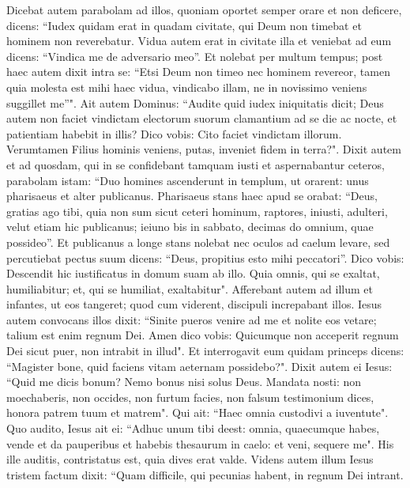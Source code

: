 \begin{biblechapter}  
\verse Dicebat autem parabolam ad illos, quoniam oportet semper orare et non deficere, 
\verse dicens: “Iudex quidam erat in quadam civitate, qui Deum non timebat et hominem non reverebatur. 
\verse Vidua autem erat in civitate illa et veniebat ad eum dicens: “Vindica me de adversario meo”. 
\verse Et nolebat per multum tempus; post haec autem dixit intra se: “Etsi Deum non timeo nec hominem revereor, 
\verse tamen quia molesta est mihi haec vidua, vindicabo illam, ne in novissimo veniens suggillet me”". 
\verse Ait autem Dominus: “Audite quid iudex iniquitatis dicit; 
\verse Deus autem non faciet vindictam electorum suorum clamantium ad se die ac nocte, et patientiam habebit in illis? 
\verse Dico vobis: Cito faciet vindictam illorum. Verumtamen Filius hominis veniens, putas, inveniet fidem in terra?". 
\verse Dixit autem et ad quosdam, qui in se confidebant tamquam iusti et aspernabantur ceteros, parabolam istam: 
\verse “Duo homines ascenderunt in templum, ut orarent: unus pharisaeus et alter publicanus. 
\verse Pharisaeus stans haec apud se orabat: “Deus, gratias ago tibi, quia non sum sicut ceteri hominum, raptores, iniusti, adulteri, velut etiam hic publicanus; 
\verse ieiuno bis in sabbato, decimas do omnium, quae possideo”. 
\verse Et publicanus a longe stans nolebat nec oculos ad caelum levare, sed percutiebat pectus suum dicens: “Deus, propitius esto mihi peccatori”. 
\verse Dico vobis: Descendit hic iustificatus in domum suam ab illo. Quia omnis, qui se exaltat, humiliabitur; et, qui se humiliat, exaltabitur". 
\verse Afferebant autem ad illum et infantes, ut eos tangeret; quod cum viderent, discipuli increpabant illos. 
\verse Iesus autem convocans illos dixit: “Sinite pueros venire ad me et nolite eos vetare; talium est enim regnum Dei. 
\verse Amen dico vobis: Quicumque non acceperit regnum Dei sicut puer, non intrabit in illud". 
\verse Et interrogavit eum quidam princeps dicens: “Magister bone, quid faciens vitam aeternam possidebo?". 
\verse Dixit autem ei Iesus: “Quid me dicis bonum? Nemo bonus nisi solus Deus. 
\verse Mandata nosti: non moechaberis, non occides, non furtum facies, non falsum testimonium dices, honora patrem tuum et matrem". 
\verse Qui ait: “Haec omnia custodivi a iuventute". 
\verse Quo audito, Iesus ait ei: “Adhuc unum tibi deest: omnia, quaecumque habes, vende et da pauperibus et habebis thesaurum in caelo: et veni, sequere me". 
\verse His ille auditis, contristatus est, quia dives erat valde. 
\verse Videns autem illum Iesus tristem factum dixit: “Quam difficile, qui pecunias habent, in regnum Dei intrant.  

\end{biblechapter}
